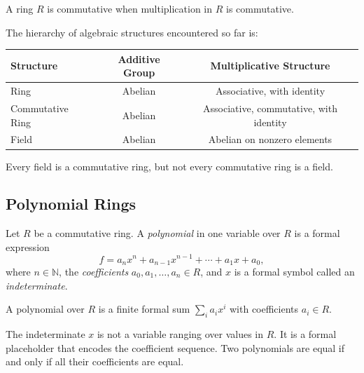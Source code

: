 \begin{remark*}
A ring $R$ is commutative when multiplication in $R$ is commutative.
\end{remark*}

\begin{remark*}
The hierarchy of algebraic structures encountered so far is:

\begin{center}
\begin{tabular}{l|c|c}
Structure & Additive Group & Multiplicative Structure \\
\hline
Ring            & Abelian & Associative, with identity \\
Commutative Ring & Abelian & Associative, commutative, with identity \\
Field           & Abelian & Abelian on nonzero elements
\end{tabular}
\end{center}

Every field is a commutative ring, but not every commutative ring is a field.
\end{remark*}

\subsection*{Polynomial Rings}

\begin{definition}[Polynomial]
\label{def:polynomial-over-ring}
Let $R$ be a commutative ring.
A \emph{polynomial} in one variable over $R$ is a formal expression
\[
f = a_n x^n + a_{n-1} x^{n-1} + \cdots + a_1 x + a_0,
\]
where $n \in \mathbb{N}$, the \emph{coefficients} $a_0, a_1, \dots, a_n \in R$,
and $x$ is a formal symbol called an \emph{indeterminate}.
\end{definition}

\begin{remark*}
A polynomial over $R$ is a finite formal sum $\sum_i a_i x^i$ with
coefficients $a_i \in R$.
\end{remark*}

\begin{remark*}[Interpretation]
The indeterminate $x$ is not a variable ranging over values in $R$.
It is a formal placeholder that encodes the coefficient sequence.
Two polynomials are equal if and only if all their coefficients are equal.
\end{remark*}

